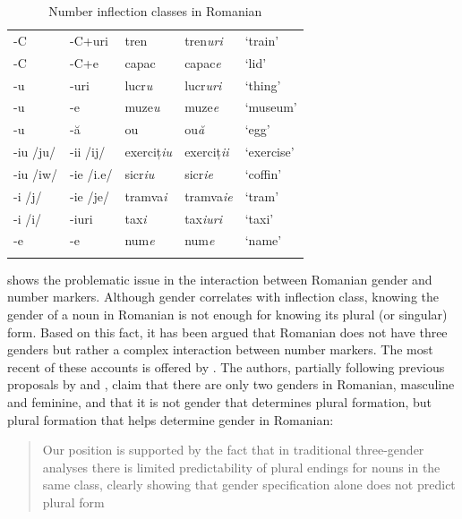 \begin{table}[!htbp]
\begin{tabular}{lllll}
    -C         & -C+uri     & tren      & tren\textit{uri}   & `train'          \\
    -C         & -C+e       & capac     & capac\textit{e}    & `lid'            \\
    -u         & -uri       & lucr\textit{u}     & lucr\textit{uri}   & `thing'          \\
    -u         & -e         & muze\textit{u}     & muze\textit{e}     & `museum'         \\
    -u         & -ă         & ou        & ou\textit{ă}       & `egg'            \\
    -iu /ju/   & -ii /ij/   & exerciț\textit{iu} & exerciț\textit{ii} & `exercise'       \\
    -iu /iw/   & -ie /i.e/  & sicr\textit{iu}    & sicr\textit{ie}    & `coffin'         \\
    -i  /j/    & -ie /je/   & tramva\textit{i}   & tramva\textit{ie}  & `tram'           \\
    -i  /i/    & -iuri      & tax\textit{i}      & tax\textit{iuri}   & `taxi'           \\
    -e         & -e         & num\textit{e}      & num\textit{e}      & `name'           \\
    \lspbottomrule
  \end{tabular}\caption{Number inflection classes in Romanian}\label{tab:romanian-plural-clases}
\end{table}

 shows the problematic issue in the interaction between Romanian gender and number markers. Although gender correlates with inflection class, knowing the gender of a noun in Romanian is not enough for knowing its plural (or singular) form. Based on this fact, it has been argued that Romanian does not have three genders but rather a complex interaction between number markers. The most recent of these accounts is offered by \textcite{Bateman.2010}. The authors, partially following previous proposals by \textcite{Hall.1965} and \textcite{Farkas.1995}, claim that there are only two genders in Romanian, masculine and feminine, and that it is not gender that determines plural formation, but plural formation that helps determine gender in Romanian:
%
\nocite{Gerdts.2010} %
\largerpage[2]
\begin{quotation}
Our position is supported by the fact that in traditional three-gender analyses there is limited predictability of plural endings for nouns in the same class, clearly showing that gender specification alone does not predict plural form \autocite[53]{Bateman.2010}
\end{quotation}

